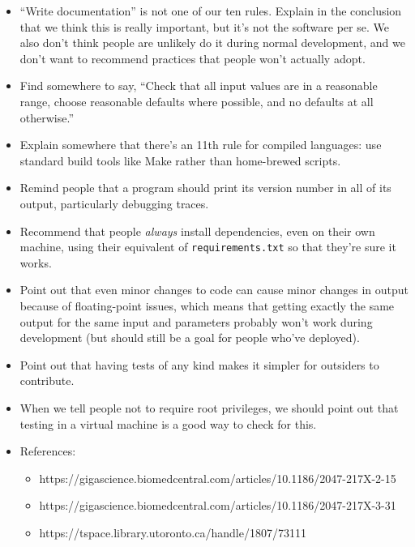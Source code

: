 \documentclass[10pt,letterpaper]{article}
\begin{document}
\begin{itemize}

\item
``Write documentation'' is not one of our ten rules.
Explain in the conclusion that we think this is really important,
but it's not the software per se.
We also don't think people are unlikely do it during normal development,
and we don't want to recommend practices that people won't actually adopt.

\item
Find somewhere to say, ``Check that all input values are in a reasonable range,
choose reasonable defaults where possible,
and no defaults at all otherwise.''

\item
Explain somewhere that there's an 11th rule for compiled languages:
use standard build tools like Make
rather than home-brewed scripts.

\item
Remind people that a program should print its version number in all of its output,
particularly debugging traces.

\item
Recommend that people \emph{always} install dependencies, even on their own machine,
using their equivalent of \texttt{requirements.txt}
so that they're sure it works.

\item
Point out that even minor changes to code can cause minor changes in output
because of floating-point issues,
which means that getting exactly the same output for the same input and parameters
probably won't work during development
(but should still be a goal for people who've deployed).

\item
Point out that having tests of any kind makes it simpler for outsiders to contribute.

\item
When we tell people not to require root privileges,
we should point out that testing in a virtual machine is a good way to check for this.

\item
References:
  \begin{itemize}
  \item https://gigascience.biomedcentral.com/articles/10.1186/2047-217X-2-15
  \item https://gigascience.biomedcentral.com/articles/10.1186/2047-217X-3-31
  \item https://tspace.library.utoronto.ca/handle/1807/73111
  \end{itemize}


\end{itemize}
\end{document}
